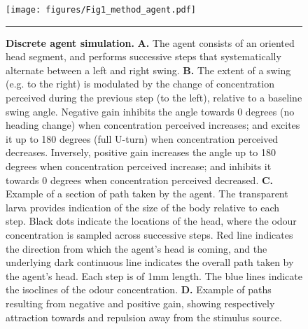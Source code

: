 \documentclass[10pt,a4paper]{article}
\begin{document}
\begin{figure}[!ht]
\begin{center}
\texttt{[image: figures/Fig1\_method\_agent.pdf]}
\caption{
{\bf Discrete agent simulation.} {\bf A.} The agent consists of an oriented head segment, and performs successive steps that systematically alternate between a left and right swing. {\bf B.} The extent of a swing (e.g. to the right) is modulated by the change of concentration perceived during the previous step (to the left), relative to a baseline swing angle. Negative gain inhibits the angle towards 0 degrees (no heading change) when concentration perceived increases; and excites it up to 180 degrees (full U-turn) when concentration perceived decreases. Inversely, positive gain increases the angle up to 180 degrees when concentration perceived increase; and inhibits it towards 0 degrees when concentration perceived decreased.
{\bf C.} Example of a section of path taken by the agent. The transparent larva provides indication of the size of the body relative to each step. Black dots indicate the locations of the head, where the odour concentration is sampled across successive steps. Red line indicates the direction from which the agent’s head is coming, and the underlying dark continuous line indicates the overall path taken by the agent’s head. Each step is of 1mm length. The blue lines indicate the isoclines of the odour concentration.
{\bf D.} Example of paths resulting from negative and positive gain, showing respectively attraction towards and repulsion away from the stimulus source.
\label{fig:Fig1}}
\hrule
\end{center}
\end{figure}
\end{document}
